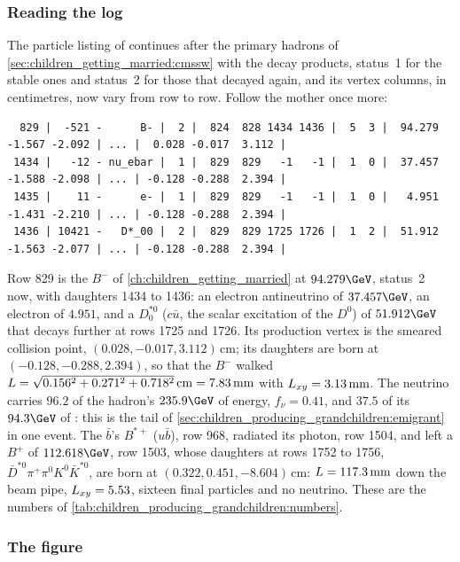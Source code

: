 \subsubsection{Reading the log}

The particle listing of  continues after the
primary hadrons of \cref{sec:children_getting_married:cmssw} with the
decay products, status~1 for the stable ones and status~2 for those that
decayed again, and its vertex columns, in centimetres, now vary from row
to row. Follow the mother once more:
\begin{verbatim}
  829 |  -521 -      B- |  2 |  824  828 1434 1436 |  5  3 |  94.279  -1.567 -2.092 | ... |  0.028 -0.017  3.112 |
 1434 |   -12 - nu_ebar |  1 |  829  829   -1   -1 |  1  0 |  37.457  -1.588 -2.098 | ... | -0.128 -0.288  2.394 |
 1435 |    11 -      e- |  1 |  829  829   -1   -1 |  1  0 |   4.951  -1.431 -2.210 | ... | -0.128 -0.288  2.394 |
 1436 | 10421 -   D*_00 |  2 |  829  829 1725 1726 |  1  2 |  51.912  -1.563 -2.077 | ... | -0.128 -0.288  2.394 |
\end{verbatim}
Row 829 is the $B^-$ of \cref{ch:children_getting_married} at
$94.279\GeV$, status~2 now, with daughters 1434 to 1436: an electron
antineutrino of $37.457\GeV$, an electron of $4.951$, and a $D_0^{*0}$
($c\bar u$, the scalar excitation of the $D^0$) of $51.912\GeV$ that
decays further at rows 1725 and 1726. Its production vertex is the
smeared collision point, $(0.028,-0.017,3.112)\,\mathrm{cm}$; its
daughters are born at $(-0.128,-0.288,2.394)$, so that the $B^-$ walked
$L=\sqrt{0.156^2+0.271^2+0.718^2}\,\mathrm{cm}=7.83\,\mathrm{mm}$ with
$L_{xy}=3.13\,\mathrm{mm}$. The neutrino carries $96.2$ of the hadron's $235.9\GeV$
of energy, $f_\nu=0.41$, and $37.5$ of its $94.3\GeV$ of \pt: this is the
tail of \cref{sec:children_producing_grandchildren:emigrant} in one
event. The $\bar b$'s $B^{*+}$ ($u\bar b$), row 968, radiated its photon,
row 1504, and left a $B^+$ of $112.618\GeV$, row 1503, whose daughters at
rows 1752 to 1756, $\bar D^{*0}\pi^+\pi^0K^0\bar K^{*0}$, are born at
$(0.322,0.451,-8.604)\,\mathrm{cm}$: $L=117.3\,\mathrm{mm}$ down the beam pipe,
$L_{xy}=5.53$, sixteen final particles and no neutrino. These are the
\CMSSW numbers of \cref{tab:children_producing_grandchildren:numbers}.

\subsubsection{The figure}

